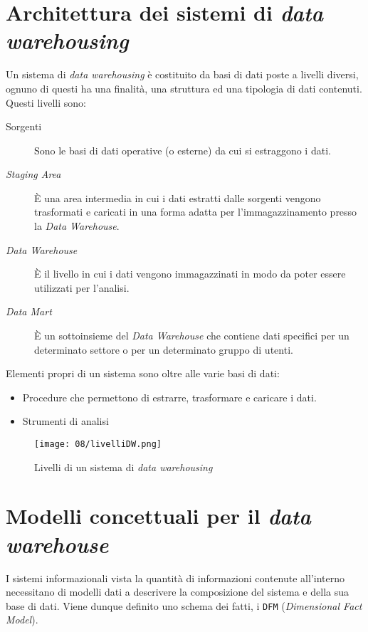\section{Architettura dei sistemi di \textit{data warehousing}}
    Un sistema di \textit{data warehousing} è costituito da basi di dati poste a livelli diversi, ognuno di questi ha una finalità, una struttura ed una tipologia di dati contenuti. Questi livelli sono:
    \begin{description}
        \item[Sorgenti] Sono le basi di dati operative (o esterne) da cui si estraggono i dati.
        \item[\textit{Staging Area}] È una area intermedia in cui i dati estratti dalle sorgenti vengono trasformati e caricati in una forma adatta per l'immagazzinamento presso la \textit{Data Warehouse}.
        \item[\textit{Data Warehouse}] È il livello in cui i dati vengono immagazzinati in modo da poter essere utilizzati per l'analisi.
        \item[\textit{Data Mart}] È un sottoinsieme del \textit{Data Warehouse} che contiene dati specifici per un determinato settore o per un determinato gruppo di utenti.
    \end{description}
    Elementi propri di un sistema sono oltre alle varie basi di dati:
    \begin{itemize}
        \item Procedure  che permettono di estrarre, trasformare e caricare i dati.
        \item Strumenti di analisi
    \end{itemize}
    \begin{figure}[H]
        \centering
        \texttt{[image: 08/livelliDW.png]}
        \caption{Livelli di un sistema di \textit{data warehousing}}
    \end{figure}

\section{Modelli concettuali per il \textit{data warehouse}}
    I sistemi informazionali vista la quantità di informazioni contenute all'interno necessitano di modelli dati a descrivere la composizione del sistema e della sua base di dati. Viene dunque definito uno schema dei fatti, i \texttt{DFM} (\textit{Dimensional Fact Model}).

